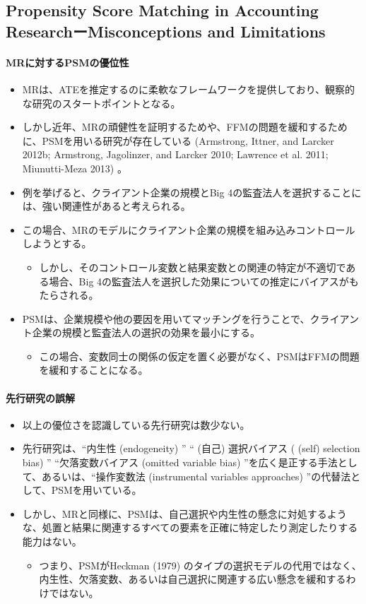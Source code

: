 \subsection*{Propensity Score Matching in Accounting ResearchーMisconceptions and Limitations}

\paragraph{MRに対するPSMの優位性}

\begin{itemize}
 \item MRは、ATEを推定するのに柔軟なフレームワークを提供しており、観察的な研究のスタートポイントとなる。
 \item しかし近年、MRの頑健性を証明するためや、FFMの問題を緩和するために、PSMを用いる研究が存在している (Armstrong, Ittner, and Larcker 2012b; Armstrong, Jagolinzer, and Larcker 2010; Lawrence et al. 2011; Miunutti-Meza 2013) 。
 \item 例を挙げると、クライアント企業の規模とBig 4の監査法人を選択することには、強い関連性があると考えられる。
 \item この場合、MRのモデルにクライアント企業の規模を組み込みコントロールしようとする。
  \begin{itemize}
   \item しかし、そのコントロール変数と結果変数との関連の特定が不適切である場合、Big 4の監査法人を選択した効果についての推定にバイアスがもたらされる。
  \end{itemize}
 \item PSMは、企業規模や他の要因を用いてマッチングを行うことで、クライアント企業の規模と監査法人の選択の効果を最小にする。
  \begin{itemize}
   \item この場合、変数同士の関係の仮定を置く必要がなく、PSMはFFMの問題を緩和することになる。
  \end{itemize}
\end{itemize}

\paragraph{先行研究の誤解}

\begin{itemize}
 \item 以上の優位さを認識している先行研究は数少ない。
 \item 先行研究は、``内生性 (endogeneity) '' `` (自己) 選択バイアス ( (self) selection bias) '' ``欠落変数バイアス (omitted variable bias) ''を広く是正する手法として、あるいは、``操作変数法 (instrumental variables approaches) ''の代替法として、PSMを用いている。
 \item しかし、MRと同様に、PSMは、自己選択や内生性の懸念に対処するような、処置と結果に関連するすべての要素を正確に特定したり測定したりする能力はない。
  \begin{itemize}
   \item つまり、PSMがHeckman (1979) のタイプの選択モデルの代用ではなく、内生性、欠落変数、あるいは自己選択に関連する広い懸念を緩和するわけではない。
  \end{itemize}
\end{itemize}


